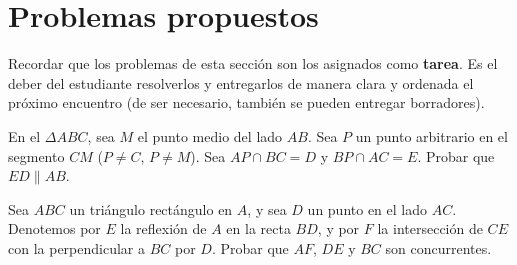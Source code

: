 \section{Problemas propuestos}

Recordar que los problemas de esta sección son los asignados como \textbf{tarea}.
Es el deber del estudiante resolverlos y entregarlos de manera clara y ordenada el próximo encuentro
(de ser necesario, también se pueden entregar borradores).

\begin{section-problem}
    En el $\Delta ABC$, sea $M$ el punto medio del lado $AB$.
    Sea $P$ un punto arbitrario en el segmento $CM$ ($P \neq C$, $P \neq M$).
    Sea $AP \cap BC = D$ y $BP \cap AC = E$.
    Probar que $ED \parallel AB$.
\end{section-problem}

\begin{section-problem}
    Sea $ABC$ un triángulo rectángulo en $A$, y sea $D$ un punto en el lado $AC$.
    Denotemos por $E$ la reflexión de $A$ en la recta $BD$, y por $F$ la intersección de $CE$ con la perpendicular a $BC$ por $D$.
    Probar que $AF$, $DE$ y $BC$ son concurrentes.
\end{section-problem}
